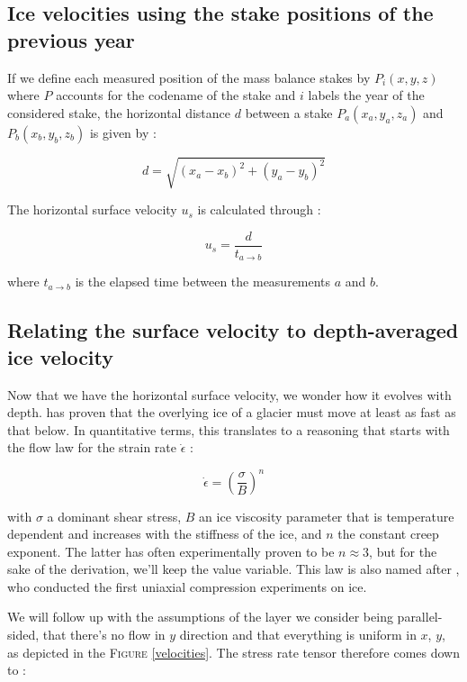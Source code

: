 \subsection*{Ice velocities using the stake positions of the previous year}

If we define each measured position of the mass balance stakes by $P_i(x,y,z)$ where $P$ accounts for the codename of the stake and $i$ labels the year of the considered stake, the horizontal distance $d$ between a stake $P_a(x_a, y_a, z_a)$ and $P_b(x_b, y_b, z_b)$ is given by :

\begin{equation}d = \sqrt{(x_a - x_b)^2 + (y_a - y_b)^2}\end{equation}

The horizontal surface velocity $u_s$ is calculated through :

\begin{equation}
\boxed{u_s = \frac{d}{t_{a \rightarrow b}}}
\end{equation}

where $t_{a \rightarrow b}$ is the elapsed time between the measurements $a$ and $b$.


\subsection*{Relating the surface velocity to depth-averaged ice velocity}

Now that we have the horizontal surface velocity, we wonder how it evolves with depth. \cite{Nye1952} has proven that the overlying ice of a glacier must move at least as fast as that below. In quantitative terms, this translates to a reasoning that starts with the flow law for the strain rate $\dot{\epsilon}$ :

\begin{equation}\dot{\epsilon} = \left( \frac{\sigma}{B} \right)^n\end{equation}

with $\sigma$ a dominant shear stress, $B$ an ice viscosity parameter that is temperature dependent and increases with the stiffness of the ice, and $n$ the constant creep exponent. The latter has often experimentally proven to be $n \approx 3$, but for the sake of the derivation, we'll keep the value variable.
This law is also named after \cite{Glen1955}, who conducted the first uniaxial compression experiments on ice.

We will follow up with the assumptions of the layer we consider being parallel-sided, that there's no flow in $y$ direction and that everything is uniform in $x$, $y$, as depicted in the \textsc{Figure} \ref{velocities}. The stress rate tensor therefore comes down to :


